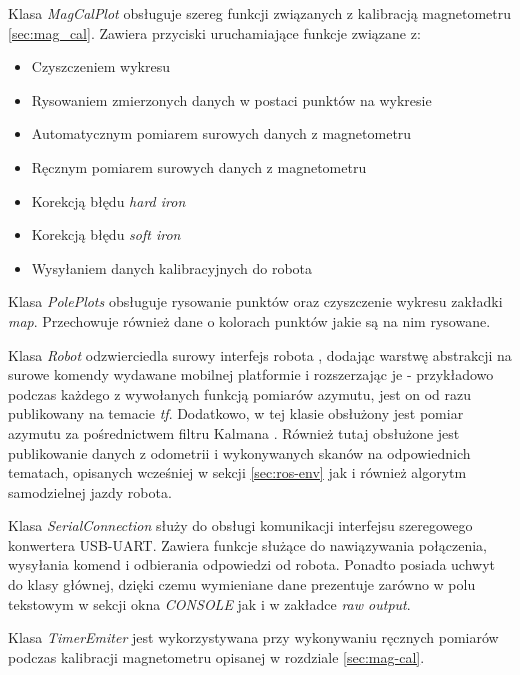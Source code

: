 Klasa \emph{MagCalPlot} obsługuje szereg funkcji związanych z kalibracją magnetometru \ref{sec:mag_cal}. Zawiera przyciski uruchamiające funkcje związane z:
\begin{itemize}
    \item Czyszczeniem wykresu
    \item Rysowaniem zmierzonych danych w postaci punktów na wykresie
    \item Automatycznym pomiarem surowych danych z magnetometru
    \item Ręcznym pomiarem surowych danych z magnetometru
    \item Korekcją błędu \emph{hard iron} \cite{hard-iron} \cite{hard-soft-iron}
    \item Korekcją błędu \emph{soft iron} \cite{hard-soft-iron}
    \item Wysyłaniem danych kalibracyjnych do robota
\end{itemize}

Klasa \emph{PolePlots} obsługuje rysowanie punktów oraz czyszczenie wykresu zakładki \emph{map}. Przechowuje również dane o kolorach punktów jakie są na nim rysowane.

Klasa \emph{Robot} odzwierciedla surowy interfejs robota \label{sec:firmware}, dodając warstwę abstrakcji na surowe komendy wydawane mobilnej platformie i rozszerzając je - przykładowo podczas każdego z wywołanych funkcją pomiarów azymutu, jest on od razu publikowany na temacie \emph{tf}. Dodatkowo, w tej klasie obsłużony jest pomiar azymutu za pośrednictwem filtru Kalmana \cite{Kedzierski2016}. Również tutaj obsłużone jest publikowanie danych z odometrii i wykonywanych skanów na odpowiednich tematach, opisanych wcześniej w sekcji \ref{sec:ros-env} jak i również algorytm samodzielnej jazdy robota.

Klasa \emph{SerialConnection} służy do obsługi komunikacji interfejsu szeregowego konwertera USB-UART. Zawiera funkcje służące do nawiązywania połączenia, wysyłania komend i odbierania odpowiedzi od robota. Ponadto posiada uchwyt do klasy głównej, dzięki czemu wymieniane dane prezentuje zarówno w polu tekstowym w sekcji okna \emph{CONSOLE} jak i w zakładce \emph{raw output}.

Klasa \emph{TimerEmiter} jest wykorzystywana przy wykonywaniu ręcznych pomiarów podczas kalibracji magnetometru opisanej w rozdziale \ref{sec:mag-cal}.

